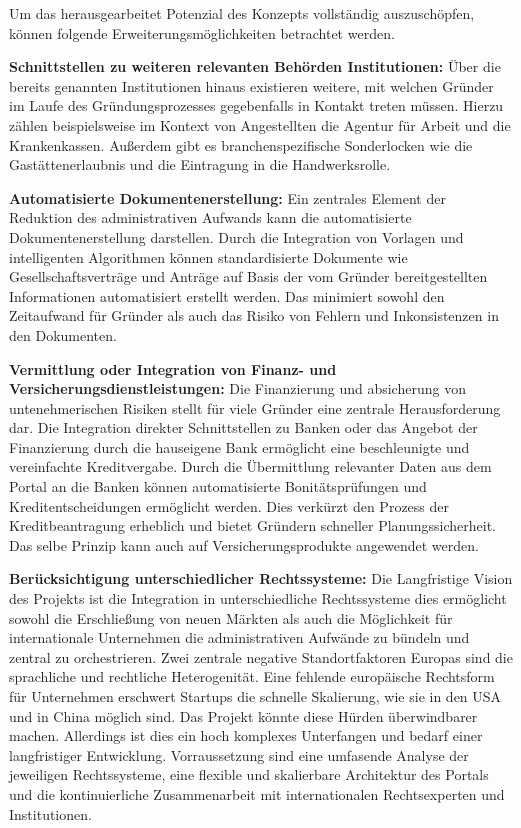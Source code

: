 Um das herausgearbeitet Potenzial des Konzepts vollständig auszuschöpfen, können folgende Erweiterungsmöglichkeiten betrachtet werden.


\textbf{Schnittstellen zu weiteren relevanten Behörden Institutionen:}
Über die bereits genannten Institutionen hinaus existieren weitere, mit welchen Gründer im Laufe des Gründungsprozesses gegebenfalls in Kontakt treten müssen.
Hierzu zählen beispielsweise im Kontext von Angestellten die Agentur für Arbeit und die Krankenkassen.
Außerdem gibt es branchenspezifische Sonderlocken wie die Gastättenerlaubnis und die Eintragung in die Handwerksrolle.


\textbf{Automatisierte Dokumentenerstellung:}
Ein zentrales Element der Reduktion des administrativen Aufwands kann die automatisierte Dokumentenerstellung darstellen.
Durch die Integration von Vorlagen und intelligenten Algorithmen können standardisierte Dokumente wie Gesellschaftsverträge und Anträge auf Basis der vom Gründer bereitgestellten Informationen automatisiert erstellt werden.
Das minimiert sowohl den Zeitaufwand für Gründer als auch das Risiko von Fehlern und Inkonsistenzen in den Dokumenten.

\textbf{Vermittlung oder Integration von Finanz- und Versicherungsdienstleistungen:}
Die Finanzierung und absicherung von untenehmerischen Risiken stellt für viele Gründer eine zentrale Herausforderung dar. 
Die Integration direkter Schnittstellen zu Banken oder das Angebot der Finanzierung durch die hauseigene Bank ermöglicht eine beschleunigte und vereinfachte Kreditvergabe.
Durch die Übermittlung relevanter Daten aus dem Portal an die Banken können automatisierte Bonitätsprüfungen und Kreditentscheidungen ermöglicht werden. Dies verkürzt den Prozess der Kreditbeantragung erheblich und bietet Gründern schneller Planungssicherheit.
Das selbe Prinzip kann auch auf Versicherungsprodukte angewendet werden.

\textbf{Berücksichtigung unterschiedlicher Rechtssysteme:}
Die Langfristige Vision des Projekts ist die Integration in unterschiedliche Rechtssysteme dies ermöglicht sowohl die Erschließung von neuen Märkten als auch die Möglichkeit für internationale Unternehmen die administrativen Aufwände zu bündeln und zentral zu orchestrieren.
Zwei zentrale negative Standortfaktoren Europas sind die sprachliche und rechtliche Heterogenität. Eine fehlende europäische Rechtsform für Unternehmen erschwert Startups die schnelle Skalierung, wie sie in den USA und in China möglich sind.
Das Projekt könnte diese Hürden überwindbarer machen. Allerdings ist dies ein hoch komplexes Unterfangen und bedarf einer langfristiger Entwicklung. Vorraussetzung sind eine umfasende Analyse der jeweiligen Rechtssysteme, eine flexible und skalierbare Architektur des Portals und die kontinuierliche Zusammenarbeit mit internationalen Rechtsexperten und Institutionen.


